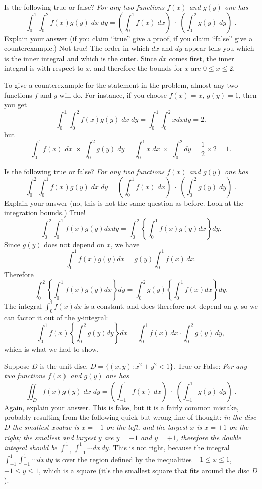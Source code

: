 \problem 
\subprob Is the following true or false? 
  \textit{For any two functions $f(x)$ and $g(y)$ one has}
\[
\int_0^1 \int_0^2 f(x) g(y) \; dx\; dy
= 
\left(\int_0^1 f(x) \; dx\right)
\; \cdot\; 
\left(\int_0^2 g(y)\; dy\right)
\; .
\]
Explain your answer (if you claim ``true'' give a proof, if you claim ``false'' give a counterexample.)
\answer
Not true!
The order in which $dx$ and $dy$ appear tells you which is the inner integral and which is the outer.  Since $dx$ comes first, the inner integral is with respect to $x$, and therefore the bounds for $x$ are $0\leq x \leq 2$.

To give a counterexample for the statement in the problem, almost any
two functions $f$ and $g$ will do.  For instance, if you choose $f(x) = x$, $g(y)=1$, then you get
\[
\int_0^1 \int_0^2 f(x) g(y) \; dx\; dy= \int_0^1\int_0^2 xdx dy = 2.
\]
but
\[
\int_0^1 f(x) \; dx\; \times\; 
\int_0^2 g(y)\; dy
=
\int_0^1 x \; dx\; \times\; 
\int_0^2  dy
=
\frac{1}{2}\times2 = 1.
\]
\endanswer

\subprob Is the following true or false? 
  \textit{For any two functions $f(x)$ and $g(y)$ one has}
\[
\int_0^2 \int_0^1 f(x) g(y) \; dx\; dy
= 
\left(\int_0^1 f(x) \; dx\right)
\; \cdot\; 
\left(\int_0^2 g(y)\; dy\right)
\; .
\]
Explain your answer (no, this is not the same question as before.  Look at the
integration bounds.) 
\answer
True!
\[
  \int_0^2\int_0^1 f(x)g(y) dx dy
  =\int_0^2\left\{ \int_0^1 f(x)g(y) dx \right\}dy .
\]
Since $g(y)$ does not depend on $x$, we have
\[
\int_0^1 f(x)g(y) dx=g(y) \int_0^1 f(x)\, dx.
\]
Therefore 
\[
  \int_0^2\left\{ \int_0^1 f(x)g(y) dx \right\}dy 
  =\int_0^2 g(y) \left\{\int_0^1 f(x) dx \right\}dy .
\]
The integral $\int_0^1 f(x)dx$ is a constant, and does therefore not depend on $y$,
so we can factor it out of the $y$-integral:
\[
  \int_0^1 f(x) \left\{\int_0^2 g(y) dy \right\}dx
  = \int_0^1 f(x)\, dx \cdot \int_0^2 g(y)\, dy,
\]
which is what we had to show.
\endanswer

\subprob Suppose $D$ is the unit disc, $D=\{(x,y): x^2+y^2<1\}$.  True or False:
\textit{For any two functions $f(x)$ and $g(y)$ one has}
\[
\iint_ D f(x) g(y) \; dx\; dy
= 
\left(\int_{-1}^1 f(x) \; dx\right)
\; \cdot\; 
\left(\int_{-1}^1 g(y)\; dy\right)
\; .
\]
Again, explain your answer.
\answer
This is false, but it is a fairly common mistake, probably resulting from the following quick but wrong line of thought:  {\itshape in the disc $D$ the smallest $x$value is $x=-1$ on the left, and the largest $x$ is $x=+1$ on the right; the smallest and largest $y$ are $y=-1$ and $y=+1$, therefore the double integral should be $\int_{-1}^1\int_{-1}^1 \cdots dx\,dy$. }  This is not right, because the integral  $\int_{-1}^1\int_{-1}^1 \cdots dx\,dy$ is over the region defined by the inequalities $-1\leq x\leq 1$, $-1\leq y\leq 1$, which is a square (it's the smallest square that fits around the disc $D$).

